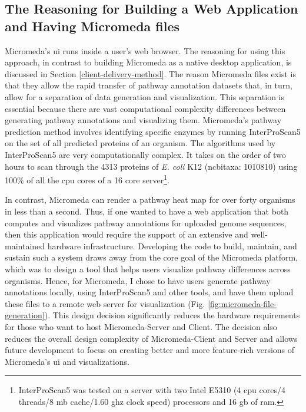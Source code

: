\subsection{The Reasoning for Building a Web Application and Having Micromeda 
files} \label{why-micromeda-files}

Micromeda's \gls{ui} runs inside a user's web browser. The reasoning for using 
this approach, in contrast to building Micromeda as a native desktop 
application, is discussed in Section \ref{client-delivery-method}. The reason 
Micromeda files exist is that they allow the rapid transfer of pathway 
annotation datasets that, in turn, allow for a separation of data generation and 
visualization. This separation is essential because there are vast computational 
complexity differences between generating pathway annotations and visualizing 
them. Micromeda's pathway prediction method involves identifying 
specific enzymes by running InterProScan5 on the set of all predicted proteins 
of an organism. The algorithms used by InterProScan5 are very computationally 
complex. It takes on the order of two hours to scan through the 4313 proteins of 
\textit{E. coli} K12 (\gls{ncbitaxa}: 1010810) using 100\% of all the \gls{cpu} 
cores of a 16 core server\footnote{InterProScan5 was tested on a server with two 
Intel E5310 (4 \gls{cpu} cores/4 threads/8 \gls{mb} cache/1.60 \gls{ghz} clock 
speed) processors and 16 \gls{gb}  of \gls{ram}.}.

In contrast, Micromeda can render a pathway heat map for over forty organisms in 
less than a second. Thus, if one wanted to have a web application that both 
computes and visualizes pathway annotations for uploaded genome sequences, then 
this application would require the support of an extensive and well-maintained 
hardware infrastructure. Developing the code to build, maintain, and sustain 
such a system draws away from the core goal of the Micromeda platform, which was 
to design a tool that helps users visualize pathway differences across 
organisms. Hence, for Micromeda, I chose to have users generate pathway 
annotations locally, using InterProScan5 and other tools, and have them upload 
these files to a remote web server for visualization (Fig. 
\ref{fig:micromeda-file-generation}). This design decision significantly reduces 
the hardware requirements for those who want to host Micromeda-Server and 
Client. The decision also reduces the overall design complexity of 
Micromeda-Client and Server and allows future development to focus on creating 
better and more feature-rich versions of Micromeda's \gls{ui} and 
visualizations.

